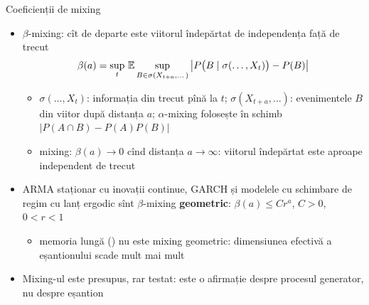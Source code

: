 \begin{frame}{Coeficienții de mixing}
\itemsize{\small}
\begin{itemize}
    \item $\beta$-mixing: cît de departe este viitorul îndepărtat de independența față de trecut
    \[ \beta(a) = \sup_t\,\mathbb{E}\sup_{B\in\sigma(X_{t+a},\dots)}\big|P\big(B\mid\sigma(\dots,X_t)\big) - P(B)\big| \]
    \begin{itemize}
        \item $\sigma(\dots, X_t)$: informația din trecut pînă la $t$; $\sigma(X_{t+a}, \dots)$: evenimentele $B$ din viitor după distanța $a$; $\alpha$-mixing folosește în schimb $|P(A\cap B) - P(A)P(B)|$
        \item mixing: $\beta(a) \to 0$ cînd distanța $a \to \infty$: viitorul îndepărtat este aproape independent de trecut
    \end{itemize}
    \item ARMA staționar cu inovații continue, GARCH și modelele cu schimbare de regim cu lanț ergodic sînt $\beta$-mixing \textbf{geometric}: $\beta(a) \le Cr^a$, $C > 0$, $0 < r < 1$
    \begin{itemize}
        \item memoria lungă () nu este mixing geometric: dimensiunea efectivă a eșantionului scade mult mai mult
    \end{itemize}
    \item Mixing-ul este presupus, rar testat: este o afirmație despre procesul generator, nu despre eșantion
\end{itemize}
\end{frame}

